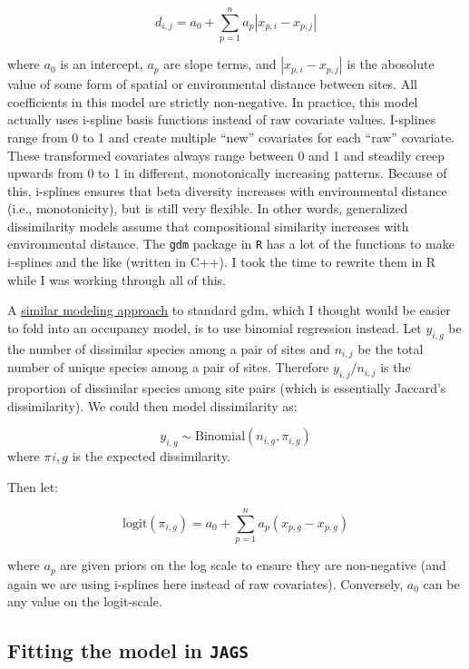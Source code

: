 \documentclass[
]{article}
\begin{document}
\[d_{i,j} = a_0 + \sum_{p=1}^n a_p |x_{p,i} - x_{p,j}|\]

where \(a_0\) is an intercept, \(a_p\) are slope terms, and
\(|x_{p,i} - x_{p,j}|\) is the abosolute value of some form of spatial
or environmental distance between sites. All coefficients in this model
are strictly non-negative. In practice, this model actually uses
i-spline basis functions instead of raw covariate values. I-splines
range from 0 to 1 and create multiple ``new'' covariates for each
``raw'' covariate. These transformed covariates always range between 0
and 1 and steadily creep upwards from 0 to 1 in different, monotonically
increasing patterns. Because of this, i-splines ensures that beta
diversity increases with environmental distance (i.e., monotonicity),
but is still very flexible. In other words, generalized dissimilarity
models assume that compositional similarity increases with environmental
distance. The \texttt{gdm} package in \texttt{R} has a lot of the
functions to make i-splines and the like (written in C++). I took the
time to rewrite them in R while I was working through all of this.

A
\href{https://besjournals.onlinelibrary.wiley.com/doi/10.1111/2041-210X.12710}{similar
modeling approach} to standard gdm, which I thought would be easier to
fold into an occupancy model, is to use binomial regression instead. Let
\(y_{i,g}\) be the number of dissimilar species among a pair of sites
and \(n_{i,j}\) be the total number of unique species among a pair of
sites. Therefore \(y_{i,j}/n_{i,j}\) is the proportion of dissimilar
species among site pairs (which is essentially Jaccard's dissimilarity).
We could then model dissimilarity as:

\[y_{i,g} \sim \text{Binomial}(n_{i,g}, \pi_{i,g})\] where \(\pi_{}i,g\)
is the expected dissimilarity.

Then let:

\[\text{logit}(\pi_{i,g}) = a_0 + \sum_{p=1}^n a_p (x_{p,g} - x_{p,g})\]

where \(a_p\) are given priors on the log scale to ensure they are
non-negative (and again we are using i-splines here instead of raw
covariates). Conversely, \(a_0\) can be any value on the logit-scale.

\hypertarget{fitting-the-model-in-jags}{%
\subsection{\texorpdfstring{Fitting the model in
\texttt{JAGS}}{Fitting the model in JAGS}}\label{fitting-the-model-in-jags}}
\end{document}
